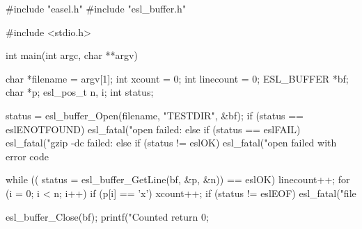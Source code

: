 \begin{cchunk}
#include "easel.h"
#include "esl_buffer.h"

#include <stdio.h>

int main(int argc, char **argv)
{
  char       *filename  = argv[1];
  int         xcount    = 0;
  int         linecount = 0;
  ESL_BUFFER *bf;
  char       *p;
  esl_pos_t   n, i;
  int         status;

  status = esl_buffer_Open(filename, "TESTDIR", &bf);
  if      (status == eslENOTFOUND) esl_fatal("open failed: %
  else if (status == eslFAIL)      esl_fatal("gzip -dc failed: %
  else if (status != eslOK)        esl_fatal("open failed with error code %
  
  while (( status = esl_buffer_GetLine(bf, &p, &n)) == eslOK) 
    {
      linecount++;
      for (i = 0; i < n; i++)
	if (p[i] == 'x') xcount++;
    }
  if (status != eslEOF) esl_fatal("file %

  esl_buffer_Close(bf);
  printf("Counted %
  return 0;
}
\end{cchunk}
